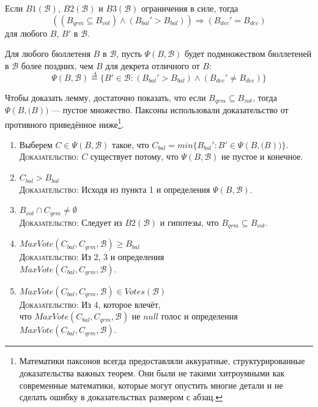 \documentclass[12pt, a4paper]{article} %
\begin{document}
\begin{lemma}
Если $B1(\mathcal{B})$, $B2(\mathcal{B})$ и $B3(\mathcal{B})$ ограничения в силе, тогда
\[
    ((B_{qrm} \subseteq B_{vot}) \land (B_{bal}' > B_{bal})) \Rightarrow (B_{dec}' = B_{dec})
\]
для любого $B$, $B'$ в $\mathcal{B}$.
\end{lemma}
\begin{lemmaproof}
Для любого бюллетеня $B$ в $\mathcal{B}$, пусть $\Psi(B, \mathcal{B})$ будет подмножеством бюллетеней в $\mathcal{B}$ более поздних, чем $B$ для декрета отличного от $B$:
\[
    \Psi(B, \mathcal{B}) \overset{\Delta}{=} \{B' \in \mathcal{B} : (B_{bal}' > B_{bal}) \land (B_{dec}' \neq B_{dec})\}
\]

Чтобы доказать лемму, достаточно показать, что если $B_{qrm} \subseteq B_{vot}$, тогда $\Psi(B, \mathcal(B))$ --- пустое множество. Паксоны использовали доказательство от противного приведённое ниже\footnote{Математики паксонов всегда предоставляли аккуратные, структурированные доказательства важных теорем. Они были не такими хитроумными как современные математики, которые могут опустить многие детали и не сделать ошибку в доказательствах размером с абзац.}.
\begin{enumerate}
    \item Выберем $C \in \Psi(B, \mathcal{B})$ такое, что $C_{bal} = min \{B_{bal}' : B' \in \Psi(B, \mathcal(B))\}$. \\
          \textsc{Доказательство}: $C$ существует потому, что $\Psi(B, \mathcal{B})$ не пустое и конечное.
    
    \item $C_{bal} > B_{bal}$\\
          \textsc{Доказательство}: Исходя из пункта 1 и определения $\Psi(B, \mathcal{B})$.

    \item $B_{vot} \cap C_{qrm} \neq \emptyset$\\
          \textsc{Доказательство}: Следует из  $B2(\mathcal{B})$ и гипотезы, что $B_{qrm} \subseteq B_{vot}$.
    
    \item $MaxVote(C_{bal}, C_{qrm}, \mathcal{B}) \geqslant B_{bal}$\\
          \textsc{Доказательство}: Из 2, 3 и определения\\
           $MaxVote(C_{bal}, C_{qrm}, \mathcal{B})$.

    \item $MaxVote(C_{bal}, C_{qrm}, \mathcal{B}) \in Votes(\mathcal{B})$\\
          \textsc{Доказательство}: Из 4, которое влечёт,\\ 
          что $MaxVote(C_{bal}, C_{qrm}, \mathcal{B})$ не $null$ голос и определения  $MaxVote(C_{bal}, C_{qrm}, \mathcal{B})$.


\end{enumerate}
\end{lemmaproof}
\end{document}
